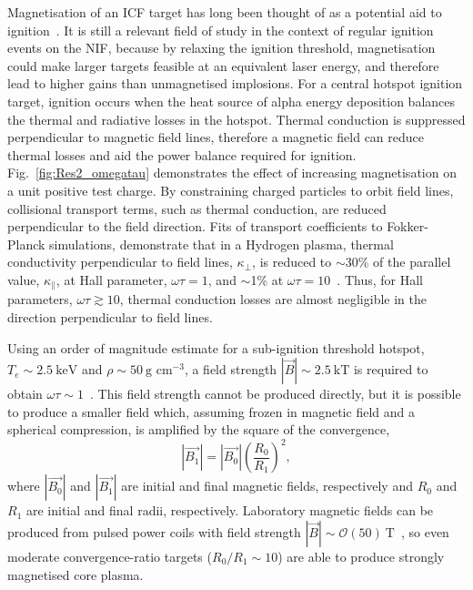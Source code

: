 Magnetisation of an \ac{ICF} target has long been thought of as a potential aid to ignition~\cite{lindemuth_parameter_1983,jones_physics_1986}.
It is still a relevant field of study in the context of regular ignition events on the \ac{NIF}, because by relaxing the ignition threshold, magnetisation could make larger targets feasible at an equivalent laser energy, and therefore lead to higher gains than unmagnetised implosions.
For a central hotspot ignition target, ignition occurs when the heat source of alpha energy deposition balances the thermal and radiative losses in the hotspot.
Thermal conduction is suppressed perpendicular to magnetic field lines, therefore a magnetic field can reduce thermal losses and aid the power balance required for ignition.
Fig.~\ref{fig:Res2_omegatau} demonstrates the effect of increasing magnetisation on a unit positive test charge.
By constraining charged particles to orbit field lines, collisional transport terms, such as thermal conduction, are reduced perpendicular to the field direction.
Fits of transport coefficients to Fokker-Planck simulations, demonstrate that in a Hydrogen plasma, thermal conductivity perpendicular to field lines, $\kappa_{\perp}$, is reduced to $\sim$30\% of the parallel value, $\kappa_{\parallel}$, at Hall parameter, $\omega\tau=1$, and $\sim$1\% at $\omega\tau=10$~\cite{epperlein_plasma_1986}.
Thus, for Hall parameters, $\omega\tau\gtrsim 10$, thermal conduction losses are almost negligible in the direction perpendicular to field lines.

Using an order of magnitude estimate for a sub-ignition threshold hotspot, $T_e\sim 2.5\ \text{keV}$ and $\rho\sim50\ \text{g cm}^{-3}$, a field strength $|\vec{B}|\sim 2.5\ \text{kT}$ is required to obtain $\omega\tau\sim1$~\cite{oneill_modelling_2023}.
This field strength cannot be produced directly, but it is possible to produce a smaller field which, assuming frozen in magnetic field and a spherical compression, is amplified by the square of the convergence,
\begin{equation}
    \label{eq:Res2_flux_compression}
    |\vec{B_1}|=|\vec{B_0}| \left(\frac{R_0}{R_1}\right)^2,
\end{equation}
where $|\vec{B_0}|$ and $|\vec{B_1}|$ are initial and final magnetic fields, respectively and $R_0$ and $R_1$ are initial and final radii, respectively.
Laboratory magnetic fields can be produced from pulsed power coils with field strength $|\vec{B}|\sim\mathcal{O}(50)\ \text{T}$~\cite{fiksel_note_2015}, so even moderate convergence-ratio targets ($R_0/R_1\sim10$) are able to produce strongly magnetised core plasma.

